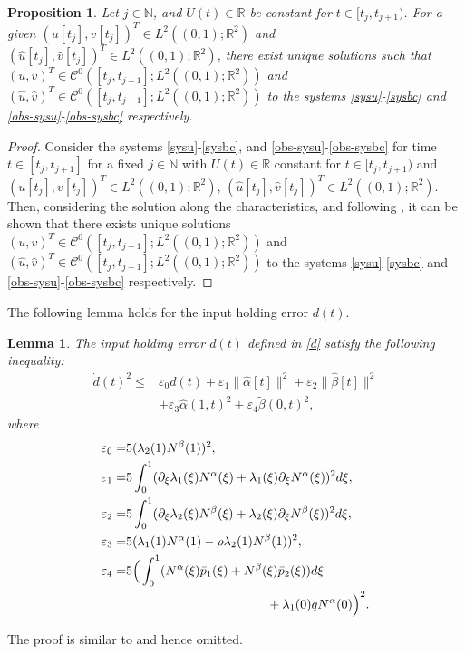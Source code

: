 \documentclass[letterpaper, 10 pt, conference]{ieeeconf}
\newtheorem{lemma}{Lemma}
\newtheorem{proposition}{Proposition}
\begin{document}
\begin{proposition}\label{propo:wellposedness}
    Let $j\in\mathbb{N}$, and $U(t)\in\mathbb{R}$ be constant for $t\in[t_j,t_{j+1})$. For a given $(u[t_j], v[t_j])^T \in L^2((0,1);\mathbb{R}^2)$ and $(\hat u[t_j], \hat v[t_j])^T \in L^2((0,1);\mathbb{R}^2)$, there exist unique solutions such that $(u, v)^T \in \mathcal{C}^0([t_j, t_{j+1}];  L^2((0,1);\mathbb{R}^2))$ and $(\hat 
    {u}, \hat{v})^T \in \mathcal{C}^0([t_j,t_{j+1}]; L^2((0,1);\mathbb{R}^2))$ to the systems \eqref{sysu}-\eqref{sysbc} and \eqref{obs-sysu}-\eqref{obs-sysbc} respectively. 
\end{proposition}
\begin{proof}
    Consider the systems \eqref{sysu}-\eqref{sysbc}, and \eqref{obs-sysu}-\eqref{obs-sysbc} for time $t\in[t_j,t_{j+1}]$ for a fixed $j\in\mathbb{N}$ with $U(t)\in\mathbb{R}$ constant for $t\in[t_j,t_{j+1})$ and $(u[t_j], v[t_j])^T \in L^2((0,1);\mathbb{R}^2)$, $(\hat u[t_j], \hat v[t_j])^T \in L^2((0,1);\mathbb{R}^2)$. Then, considering the solution along the characteristics, and following \cite[Appendix A]{coron2021_time_varying_coefficients}, it can be shown that there exists unique solutions $(u, v)^T \in \mathcal{C}^0([t_j, t_{j+1}];  L^2((0,1);\mathbb{R}^2))$ and $(\hat 
    {u}, \hat{v})^T \in \mathcal{C}^0([t_j,t_{j+1}]; L^2((0,1);\mathbb{R}^2))$ to the systems \eqref{sysu}-\eqref{sysbc} and \eqref{obs-sysu}-\eqref{obs-sysbc} respectively.
\end{proof}

The following lemma holds for the input holding error $d(t)$.
\begin{lemma}
    The input holding error $d(t)$ defined in \eqref{d} satisfy the following inequality:
    \begin{equation}
    \begin{aligned}
        \dot d(t) ^2 \leq& \varepsilon_0 d(t) + \varepsilon_1 \|\hat \alpha[t]\|^2 + \varepsilon_2 \|\hat \beta[t]\|^2\\&  + \varepsilon_3 \hat\alpha(1,t)^2+ \varepsilon_4 \tilde \beta(0,t)^2,\label{dotd2}
        \end{aligned}
    \end{equation}
    where
    \begin{align}
        \varepsilon_0 =& 5 (\lambda_2(1) N^\beta(1))^2,\\
        \varepsilon_1 =& 5 \int_0^1 (\partial_\xi\lambda_1(\xi)N^\alpha(\xi)+\lambda_1(\xi)\partial_\xi N^\alpha(\xi))^2d\xi,\\
        \varepsilon_2 =& 5 \int_0^1 (\partial_\xi\lambda_2(\xi)N^\beta(\xi)+\lambda_2(\xi)\partial_\xi N^\beta(\xi))^2d\xi,\\
        \varepsilon_3 =& 5 (\lambda_1(1) N^\alpha(1) - \rho\lambda_2(1)N^\beta(1))^2,\\
        \varepsilon_4 =& 5 \Big(\int_0^1( N^\alpha(\xi)\bar p_1(\xi) + N^\beta(\xi)\bar p_2(\xi))d\xi\nonumber\\
        &\mkern200mu+\lambda_1(0)qN^\alpha(0)\Big)^2.
    \end{align}
\end{lemma}
The proof is similar to \cite[Lemma 2]{espitia2020observer} and hence omitted.
\end{document}
